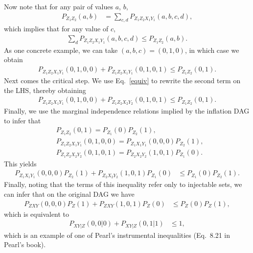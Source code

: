 \documentclass[amsmath,amssymb,aps,nofootinbib,notitlepage,superscriptaddress]{revtex4-1}%
\begin{document}
Now note that for any pair of values $a$, $b$,
\begin{align}
P_{Z_1 Z_2}(a,b) &= \sum_{c,d} P_{Z_1 Z_2 X_1 Y_1}(a,b,c,d),
\end{align}
which implies that for any value of $c$,
\begin{align}
 \sum_{d} P_{Z_1 Z_2 X_1 Y_1}(a,b,c,d) \le P_{Z_1 Z_2}(a,b).
\end{align}
As one concrete example, we can take $(a,b,c)= (0,1,0)$, in which case we obtain
\begin{align}
P_{Z_1 Z_2 X_1 Y_1}(0,1,0,0) + P_{Z_1 Z_2 X_1 Y_1}(0,1,0,1) \le P_{Z_1 Z_2}(0,1) .
\end{align}
Next comes the critical step.  We use Eq.~\eqref{equiv} to rewrite the second term on the LHS, thereby obtaining
\begin{align}
P_{Z_1 Z_2 X_1 Y_1}(0,1,0,0) + P_{Z_1 Z_2 X_2 Y_2}(0,1,0,1)\le P_{Z_1 Z_2}(0,1).
\end{align}
Finally, we use the marginal independence relations implied by the inflation DAG to infer that
\begin{align}
&P_{Z_1 Z_2}(0,1)= P_{Z_1}(0)P_{Z_2}(1),\nonumber\\
&P_{Z_1 Z_2 X_1 Y_1}(0,1,0,0) = P_{Z_1 X_1 Y_1}(0,0,0) P_{Z_2}(1),\nonumber\\
&P_{Z_1 Z_2 X_2 Y_2}(0,1,0,1) = P_{Z_2 X_2 Y_2}(1,0,1)P_{Z_1 }(0).
\end{align}
This yields 
\begin{align}
P_{Z_1 X_1 Y_1}(0,0,0) P_{Z_2}(1) + P_{Z_2 X_2 Y_2}(1,0,1)P_{Z_1 }(0) &\le  P_{Z_1}(0) P_{Z_2}(1).
\end{align}
Finally, noting that the terms of this inequality refer only to injectable sets, we can infer that on the original DAG we have
\begin{align}
P_{Z X Y}(0,0,0) P_{Z}(1) + P_{Z X Y}(1,0,1)P_{Z }(0) &\le  P_{Z}(0) P_{Z}(1),
\end{align}
which is equivalent to 
\begin{align}
P_{X Y|Z}(0,0|0)  + P_{X Y|Z}(0,1|1) &\le  1,
\end{align}
which is an example of one of Pearl's instrumental inequalities (Eq.~8.21 in Pearl's book). 
\end{document}
